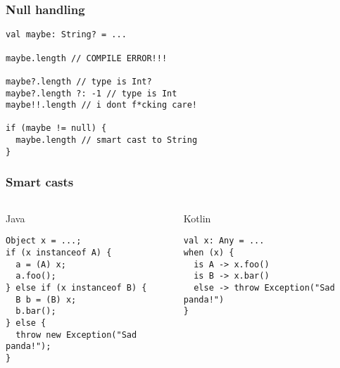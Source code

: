 \begin{withoutheadline}
\end{withoutheadline}

\begin{frame}[fragile] \frametitle{Null handling}
\begin{lstlisting}
val maybe: String? = ...

maybe.length // COMPILE ERROR!!!

maybe?.length // type is Int?
maybe?.length ?: -1 // type is Int
maybe!!.length // i dont f*cking care!

if (maybe != null) {
  maybe.length // smart cast to String
}
\end{lstlisting}
\end{frame}



\begin{frame}[fragile]
\frametitle{Smart casts}
\begin{columns}[t]
\begin{column}{0.5\textwidth}
\begin{center}
  Java
\end{center}
\begin{lstlisting}[style=twosided]
Object x = ...;
if (x instanceof A) {
  a = (A) x;
  a.foo();
} else if (x instanceof B) {
  B b = (B) x;
  b.bar();
} else {
  throw new Exception("Sad panda!");
}
\end{lstlisting}

\end{column}
\begin{column}{0.5\textwidth}
\begin{center}
  Kotlin
\end{center}
\begin{lstlisting}[style=twosided]
val x: Any = ...
when (x) {
  is A -> x.foo()
  is B -> x.bar()
  else -> throw Exception("Sad panda!")
}
\end{lstlisting}
\end{column}
\end{columns}
\end{frame}


